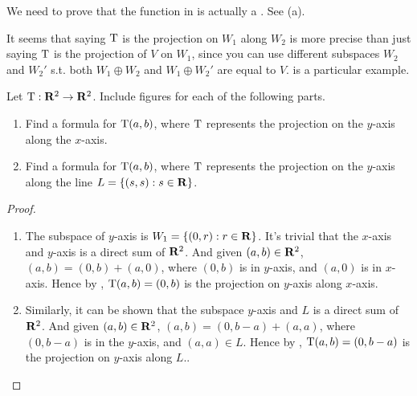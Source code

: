 \begin{note}
We need to prove that the function in  is actually a \LTRAN{}.
See (a).
\end{note}

\begin{note}
It seems that saying \(\mathrm{T}\) is the projection on \(W_1\) along \(W_2\) is more precise than just saying \(\mathrm{T}\) is the projection of \(V\) on \(W_1\), since you can use different subspaces \(W_2\) and \(W_2'\) s.t. both \(W_1 \oplus W_2\) and \(W_1 \oplus W_2'\) are equal to \(V\).
 is a particular example.
\end{note}

\begin{exercise} \label{exercise 2.1.25}
Let \(\mathrm{T} : \mathbf{R}^2 \to \mathbf{R}^2\).
Include figures for each of the following parts.
\begin{enumerate}
\item Find a formula for \(\mathrm{T}(a, b)\), where \(\mathrm{T}\) represents the projection on the \(y\)-axis along the \(x\)-axis.
\item Find a formula for \(\mathrm{T}(a, b)\), where \(\mathrm{T}\) represents the projection on the \(y\)-axis along the line \(L = \{(s, s): s \in \mathbf{R} \}\).
\end{enumerate} 
\end{exercise}

\begin{proof} \ 

\begin{enumerate}
\item The subspace of \(y\)-axis is \(W_1 = \{ (0, r) : r \in \mathbf{R} \}\).
    It's trivial that the \(x\)-axis and \(y\)-axis is a direct sum of \(\mathbf{R}^2\).
    And given \((a, b) \in \mathbf{R}^2\), \((a, b) = (0, b) + (a, 0)\), where \((0, b)\) is in \(y\)-axis, and \((a, 0)\) is in \(x\)-axis.
    Hence by , \(\mathrm{T}(a, b) = (0, b)\) is the projection on \(y\)-axis along \(x\)-axis.

\item Similarly, it can be shown that the subspace \(y\)-axis and \(L\) is a direct sum of \(\mathbf{R}^2\).
    And given \((a, b) \in \mathbf{R}^2\), \((a, b) = (0, b - a) + (a, a)\), where \((0, b - a)\) is in the \(y\)-axis, and \((a, a) \in L\).
    Hence by , \(\mathrm{T}(a, b) = (0, b - a)\) is the projection on \(y\)-axis along \(L\)..
\end{enumerate}
\end{proof}

